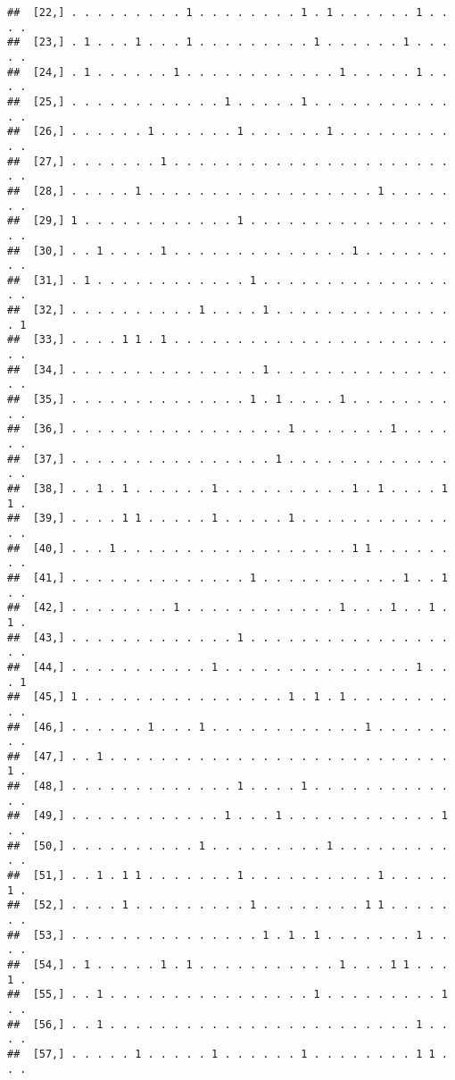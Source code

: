 \documentclass{article}\usepackage[]{graphicx}\usepackage[]{color}
\makeatletter
\newenvironment{kframe}{%
 \def\at@end@of@kframe{}%
 \ifinner\ifhmode%
  \def\at@end@of@kframe{\end{minipage}}%
  \begin{minipage}{\columnwidth}%
 \fi\fi%
 \def\FrameCommand##1{\hskip\@totalleftmargin \hskip-\fboxsep
 \colorbox{shadecolor}{##1}\hskip-\fboxsep
     \hskip-\linewidth \hskip-\@totalleftmargin \hskip\columnwidth}%
 \MakeFramed {\advance\hsize-\width
   \@totalleftmargin\z@ \linewidth\hsize
   \@setminipage}}%
 {\par\unskip\endMakeFramed%
 \at@end@of@kframe}
\newenvironment{knitrout}{}{} %
\makeatother
\begin{document}
\begin{knitrout}
\begin{kframe}
\begin{verbatim}
##  [22,] . . . . . . . . . 1 . . . . . . . . 1 . 1 . . . . . . 1 . . . .
##  [23,] . 1 . . . 1 . . . 1 . . . . . . . . . 1 . . . . . . 1 . . . . .
##  [24,] . 1 . . . . . . 1 . . . . . . . . . . . . 1 . . . . . 1 . . . .
##  [25,] . . . . . . . . . . . . 1 . . . . . 1 . . . . . . . . . . . . .
##  [26,] . . . . . . 1 . . . . . . 1 . . . . . . 1 . . . . . . . . . . .
##  [27,] . . . . . . . 1 . . . . . . . . . . . . . . . . . . . . . . . .
##  [28,] . . . . . 1 . . . . . . . . . . . . . . . . . . 1 . . . . . . .
##  [29,] 1 . . . . . . . . . . . . 1 . . . . . . . . . . . . . . . . . .
##  [30,] . . 1 . . . . 1 . . . . . . . . . . . . . . 1 . . . . . . . . .
##  [31,] . 1 . . . . . . . . . . . . 1 . . . . . . . . . . . . . . . . .
##  [32,] . . . . . . . . . . 1 . . . . 1 . . . . . . . . . . . . . . . 1
##  [33,] . . . . 1 1 . 1 . . . . . . . . . . . . . . . . . . . . . . . .
##  [34,] . . . . . . . . . . . . . . . 1 . . . . . . . . . . . . . . . .
##  [35,] . . . . . . . . . . . . . . 1 . 1 . . . . 1 . . . . . . . . . .
##  [36,] . . . . . . . . . . . . . . . . . 1 . . . . . . . 1 . . . . . .
##  [37,] . . . . . . . . . . . . . . . . 1 . . . . . . . . . . . . . . .
##  [38,] . . 1 . 1 . . . . . . 1 . . . . . . . . . . 1 . 1 . . . . 1 1 .
##  [39,] . . . . 1 1 . . . . . 1 . . . . . 1 . . . . . . . . . . . . . .
##  [40,] . . . 1 . . . . . . . . . . . . . . . . . . 1 1 . . . . . . . .
##  [41,] . . . . . . . . . . . . . . 1 . . . . . . . . . . . 1 . . 1 . .
##  [42,] . . . . . . . . 1 . . . . . . . . . . . . 1 . . . 1 . . 1 . 1 .
##  [43,] . . . . . . . . . . . . . 1 . . . . . . . . . . . . . . . . . .
##  [44,] . . . . . . . . . . . 1 . . . . . . . . . . . . . . . 1 . . . 1
##  [45,] 1 . . . . . . . . . . . . . . . . 1 . 1 . 1 . . . . . . . . . .
##  [46,] . . . . . . 1 . . . 1 . . . . . . . . . . . . 1 . . . . . . . .
##  [47,] . . 1 . . . . . . . . . . . . . . . . . . . . . . . . . . . 1 .
##  [48,] . . . . . . . . . . . . . 1 . . . . 1 . . . . . . . . . . . . .
##  [49,] . . . . . . . . . . . . 1 . . . 1 . . . . . . . . . . . . 1 . .
##  [50,] . . . . . . . . . . 1 . . . . . . . . . 1 . . . . . . . . . . .
##  [51,] . . 1 . 1 1 . . . . . . . 1 . . . . . . . . . . 1 . . . . . 1 .
##  [52,] . . . . 1 . . . . . . . . . 1 . . . . . . . . 1 1 . . . . . . .
##  [53,] . . . . . . . . . . . . . . . 1 . 1 . 1 . . . . . . . 1 . . . .
##  [54,] . 1 . . . . . 1 . 1 . . . . . . . . . . . 1 . . . 1 1 . . . 1 .
##  [55,] . . 1 . . . . . . . . . . . . . . . . 1 . . . . . . . . . 1 . .
##  [56,] . . 1 . . . . . . . . . . . . . . . . . . . . . . . . 1 . . . .
##  [57,] . . . . . 1 . . . . . 1 . . . . . . 1 . . . . . . . . 1 1 . . .

\end{verbatim}
\end{kframe}
\end{knitrout}
\end{document}
